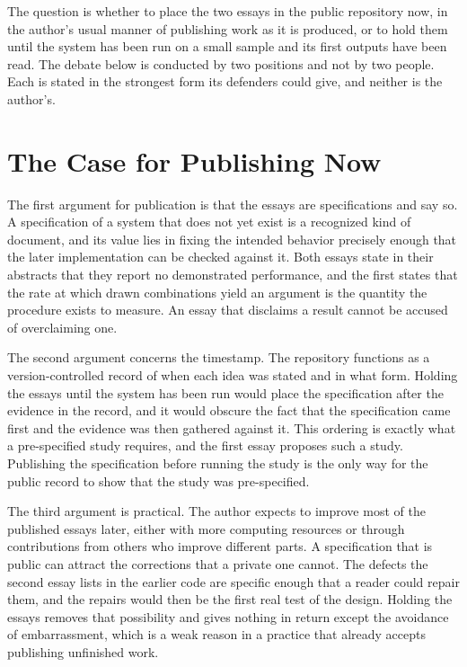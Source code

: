 \documentclass[11pt]{article}
\begin{document}
The question is whether to place the two essays in the public repository now, in the author's usual manner of publishing work as it is produced, or to hold them until the system has been run on a small sample and its first outputs have been read. The debate below is conducted by two positions and not by two people. Each is stated in the strongest form its defenders could give, and neither is the author's.

\section{The Case for Publishing Now}

The first argument for publication is that the essays are specifications and say so. A specification of a system that does not yet exist is a recognized kind of document, and its value lies in fixing the intended behavior precisely enough that the later implementation can be checked against it. Both essays state in their abstracts that they report no demonstrated performance, and the first states that the rate at which drawn combinations yield an argument is the quantity the procedure exists to measure. An essay that disclaims a result cannot be accused of overclaiming one.

The second argument concerns the timestamp. The repository functions as a version-controlled record of when each idea was stated and in what form. Holding the essays until the system has been run would place the specification after the evidence in the record, and it would obscure the fact that the specification came first and the evidence was then gathered against it. This ordering is exactly what a pre-specified study requires, and the first essay proposes such a study. Publishing the specification before running the study is the only way for the public record to show that the study was pre-specified.

The third argument is practical. The author expects to improve most of the published essays later, either with more computing resources or through contributions from others who improve different parts. A specification that is public can attract the corrections that a private one cannot. The defects the second essay lists in the earlier code are specific enough that a reader could repair them, and the repairs would then be the first real test of the design. Holding the essays removes that possibility and gives nothing in return except the avoidance of embarrassment, which is a weak reason in a practice that already accepts publishing unfinished work.
\end{document}
